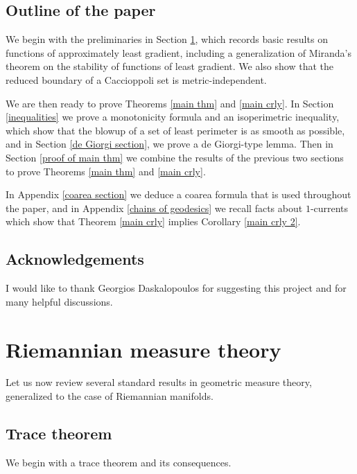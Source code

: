 \documentclass[reqno,12pt,letterpaper]{amsart}
\theoremstyle{definition}
\numberwithin{equation}{section}
\begin{document}

\subsection{Outline of the paper}
We begin with the preliminaries in Section \ref{RiemMeasureThy}, which records basic results on functions of approximately least gradient, including a generalization of Miranda's theorem \cite[Teorema 3]{Miranda67} on the stability of functions of least gradient.
We also show that the reduced boundary of a Caccioppoli set is metric-independent.

We are then ready to prove Theorems \ref{main thm} and \ref{main crly}.
In Section \ref{inequalities} we prove a monotonicity formula and an isoperimetric inequality, which show that the blowup of a set of least perimeter is as smooth as possible, and in Section \ref{de Giorgi section}, we prove a de Giorgi-type lemma.
Then in Section \ref{proof of main thm} we combine the results of the previous two sections to prove Theorems \ref{main thm} and \ref{main crly}.

In Appendix \ref{coarea section} we deduce a coarea formula that is used throughout the paper, and in Appendix \ref{chains of geodesics} we recall facts about $1$-currents which show that Theorem \ref{main crly} implies Corollary \ref{main crly 2}.


\subsection{Acknowledgements}
I would like to thank Georgios Daskalopoulos for suggesting this project and for many helpful discussions.


\section{Riemannian measure theory}\label{RiemMeasureThy}
Let us now review several standard results in geometric measure theory, generalized to the case of Riemannian manifolds.

\subsection{Trace theorem}
We begin with a trace theorem and its consequences.
\end{document}
